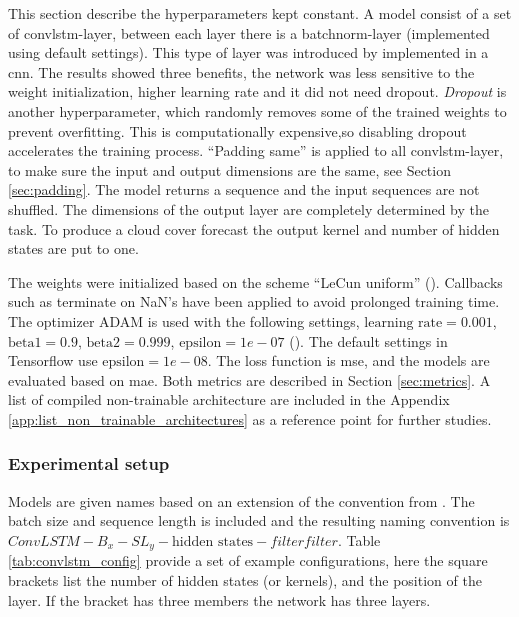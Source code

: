 This section describe the hyperparameters kept constant. A model consist of a set of \acrshort{convlstm}-layer, between each layer there is a \acrfull{batchnorm}-layer (implemented using default settings). 
This type of layer was introduced by  implemented in a \acrshort{cnn}. The results showed three benefits, the network was less sensitive to the weight initialization, higher learning rate and it did not need dropout. \textit{Dropout} is another hyperparameter, which randomly removes some of the trained weights to prevent overfitting. This is computationally expensive,so disabling dropout accelerates the training process.
``Padding same'' is applied to all \acrshort{convlstm}-layer, to make sure the input and output dimensions are the same, see Section \ref{sec:padding}. The model returns a sequence and the input sequences are not shuffled. 
The dimensions of the output layer are completely determined by the task. To produce a cloud cover forecast the output kernel and number of hidden states are put to one.

The weights were initialized based on the scheme ``LeCun uniform''  (\cite{Lecun98efficientbackprop}). Callbacks such as %
terminate on NaN's have been applied to avoid prolonged training time. The optimizer ADAM is used with the following settings, $\text{learning rate}=0.001$, $\text{beta1}=0.9$, $\text{beta2}=0.999$, $\text{epsilon}=1e-07$ (\cite{Kingma2015Adam:Optimization}). The default settings in Tensorflow use $\text{epsilon}=1e-08$. The loss function is \acrfull{mse}, and the models are evaluated based on \acrfull{mae}. Both metrics are described in Section \ref{sec:metrics}. 
A list of compiled non-trainable architecture are included in the Appendix \ref{app:list_non_trainable_architectures} as a reference point for further studies.

\subsubsection{Experimental setup}
Models are given names based on an extension of the convention from .
The batch size and sequence length is included and 
the resulting naming convention is  $ConvLSTM-B_{x}-SL_{y}-\text{hidden states}-filter$\times$filter$. Table \ref{tab:convlstm_config} provide a set of example configurations, here the square brackets list the number of hidden states (or kernels), and the position of the layer. If the bracket has three members the network has three layers. %



